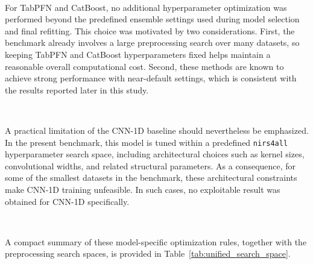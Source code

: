 \documentclass{article}
\begin{document}
~

For TabPFN and CatBoost, no additional hyperparameter optimization was performed beyond the predefined ensemble settings used during model selection and final refitting. This choice was motivated by two considerations. First, the benchmark already involves a large preprocessing search over many datasets, so keeping TabPFN and CatBoost hyperparameters fixed helps maintain a reasonable overall computational cost. Second, these methods are known to achieve strong performance with near-default settings, which is consistent with the results reported later in this study.

~

A practical limitation of the CNN-1D baseline should nevertheless be emphasized. In the present benchmark, this model is tuned within a predefined \texttt{nirs4all}  hyperparameter search space, including architectural choices such as kernel sizes, convolutional widths, and related structural parameters. As a consequence, for some of the smallest datasets in the benchmark, these architectural constraints make CNN-1D training unfeasible. In such cases, no exploitable result was obtained for CNN-1D specifically.


~

A compact summary of these model-specific optimization rules, together with the preprocessing search spaces, is provided in Table~\ref{tab:unified_search_space}.
\end{document}
